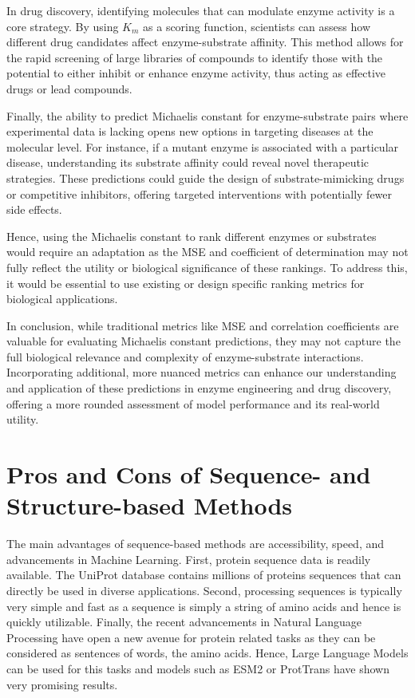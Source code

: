 In drug discovery, identifying molecules that can modulate enzyme activity is a core strategy. By using $K_m$ as a scoring function, scientists can assess how different drug candidates affect enzyme-substrate affinity. This method allows for the rapid screening of large libraries of compounds to identify those with the potential to either inhibit or enhance enzyme activity, thus acting as effective drugs or lead compounds.

Finally, the ability to predict Michaelis constant for enzyme-substrate pairs where experimental data is lacking opens new options in targeting diseases at the molecular level. For instance, if a mutant enzyme is associated with a particular disease, understanding its substrate affinity could reveal novel therapeutic strategies. These predictions could guide the design of substrate-mimicking drugs or competitive inhibitors, offering targeted interventions with potentially fewer side effects.

Hence, using the Michaelis constant to rank different enzymes or substrates would require an adaptation as the MSE and coefficient of determination may not fully reflect the utility or biological significance of these rankings. To address this, it would be essential to use existing or design specific ranking metrics for biological applications.

In conclusion, while traditional metrics like MSE and correlation coefficients are valuable for evaluating Michaelis constant predictions, they may not capture the full biological relevance and complexity of enzyme-substrate interactions. Incorporating additional, more nuanced metrics can enhance our understanding and application of these predictions in enzyme engineering and drug discovery, offering a more rounded assessment of model performance and its real-world utility.

\section{Pros and Cons of Sequence- and Structure-based Methods}

The main advantages of sequence-based methods are accessibility, speed, and advancements in Machine Learning. First, protein sequence data is readily available. The UniProt database contains millions of proteins sequences that can directly be used in diverse applications. Second, processing sequences is typically very simple and fast as a sequence is simply a string of amino acids and hence is quickly utilizable. Finally, the recent advancements in Natural Language Processing have open a new avenue for protein related tasks as they can be considered as sentences of words, the amino acids. Hence, Large Language Models can be used for this tasks and models such as ESM2 or ProtTrans have shown very promising results. 

